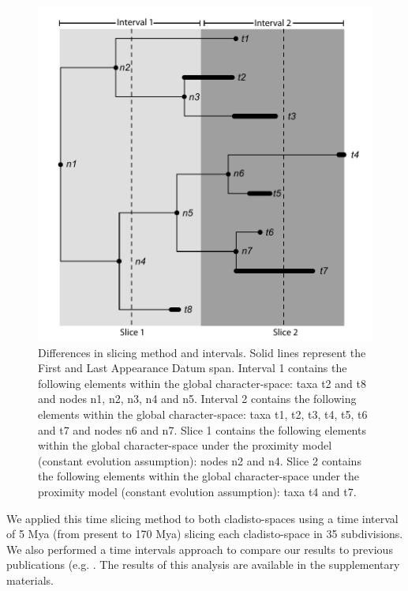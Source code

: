 \documentclass[12pt,letterpaper]{article}
\begin{document}
\begin{figure}[!htbp]
\centering
    \includegraphics[keepaspectratio=true]{Figures/Slicing.pdf}
\caption{Differences in slicing method and intervals. Solid lines represent the First and Last Appearance Datum span. Interval 1 contains the following elements within the global character-space: taxa t2 and t8 and nodes n1, n2, n3, n4 and n5. Interval 2 contains the following elements within the global character-space: taxa t1, t2, t3, t4, t5, t6 and t7 and nodes n6 and n7. Slice 1 contains the following elements within the global character-space under the proximity model (constant evolution assumption): nodes n2 and n4. Slice 2 contains the following elements within the global character-space under the proximity model (constant evolution assumption): taxa t4 and t7.}
\label{fig_slicing}
\end{figure}

We applied this time slicing method to both cladisto-spaces \cite{Slater2012MEE,beckancient2014} using a time interval of 5 Mya (from present to 170 Mya) slicing each cladisto-space in 35 subdivisions. We also performed a time intervals approach to compare our results to previous publications (e.g. \cite{Brusatte12092008,brusattedinosaur2012,toljagictriassic-jurassic2013}. The results of this analysis are available in the supplementary materials.
\end{document}
